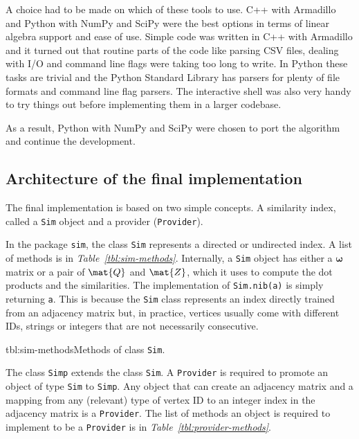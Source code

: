 \documentclass[12pt]{report}
\begin{document}
A choice had to be made on which of these tools to use. C++ with Armadillo and
Python with NumPy and SciPy were the best options in terms of linear algebra
support and ease of use. Simple code was written in C++ with Armadillo and it
turned out that routine parts of the code like parsing CSV files, dealing with
I/O and command line flags were taking too long to write. In Python these tasks
are trivial and the Python Standard Library has parsers for plenty of file
formats and command line flag parsers. The interactive shell was also very handy
to try things out before implementing them in a larger codebase.

As a result, Python with NumPy and SciPy were chosen to port the algorithm and
continue the development.

\subsection{Architecture of the final implementation}

The final implementation is based on two simple concepts. A similarity index,
called a {\tt Sim} object and a provider ({\tt Provider}).

In the package {\tt sim}, the class {\tt Sim} represents a directed or undirected
index. A list of methods is in \emph{Table~\ref{tbl:sim-methods}}. Internally,
a {\tt Sim} object has either a $\bm{\omega}$ matrix or a pair of $\mat{Q}$ and
$\mat{Z}$, which it uses to compute the dot products and the similarities. The
implementation of {\tt Sim.nib(a)} is simply returning {\tt a}. This is because
the {\tt Sim} class represents an index directly trained from an adjacency
matrix but, in practice, vertices usually come with different IDs, strings or
integers that are not necessarily consecutive.

\begin{methodListC}{tbl:sim-methods}{Methods of class {\tt Sim}.}
\end{methodListC}

The class {\tt Simp} extends the class {\tt Sim}. A {\tt Provider} is required
to promote an object of type {\tt Sim} to {\tt Simp}. Any object that can create
an adjacency matrix and a mapping from any (relevant) type of vertex ID to an
integer index in the adjacency matrix is a {\tt Provider}. The list of methods
an object is required to implement to be a {\tt Provider} is in
\emph{Table~\ref{tbl:provider-methods}}.
\end{document}
